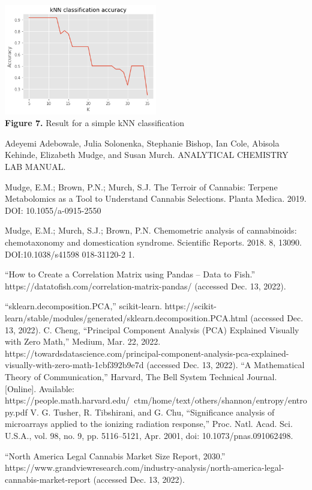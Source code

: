 \documentclass{article}
\begin{document}
\includegraphics[width=0.5\textwidth]{download.png}\\
\textbf{Figure 7.} Result for a simple kNN classification
\begin{thebibliography}{9}
Adeyemi Adebowale, Julia Solonenka, Stephanie Bishop, Ian Cole, Abisola Kehinde, Elizabeth Mudge, and Susan Murch. ANALYTICAL  CHEMISTRY  LAB MANUAL.

Mudge, E.M.; Brown, P.N.; Murch, S.J. The Terroir of Cannabis: Terpene Metabolomics as a Tool
 to Understand Cannabis Selections. Planta Medica. 2019. DOI: 10.1055/a-0915-2550

Mudge, E.M.; Murch, S.J.; Brown, P.N. Chemometric analysis of cannabinoids: chemotaxonomy
 and domestication syndrome. Scientific Reports. 2018. 8, 13090. DOI:10.1038/s41598
 018-31120-2 1. 

“How to Create a Correlation Matrix using Pandas – Data to Fish.” https://datatofish.com/correlation-matrix-pandas/ (accessed Dec. 13, 2022).

“sklearn.decomposition.PCA,” scikit-learn. https://scikit-learn/stable/modules/generated/sklearn.decomposition.PCA.html (accessed Dec. 13, 2022).
C. Cheng, “Principal Component Analysis (PCA) Explained Visually with Zero Math,” Medium, Mar. 22, 2022. https://towardsdatascience.com/principal-component-analysis-pca-explained-visually-with-zero-math-1cbf392b9e7d (accessed Dec. 13, 2022).
“A Mathematical Theory of Communication,” Harvard, The Bell System Technical Journal. [Online]. Available: https://people.math.harvard.edu/~ctm/home/text/others/shannon/entropy/entropy.pdf
V. G. Tusher, R. Tibshirani, and G. Chu, “Significance analysis of microarrays applied to the ionizing radiation response,” Proc. Natl. Acad. Sci. U.S.A., vol. 98, no. 9, pp. 5116–5121, Apr. 2001, doi: 10.1073/pnas.091062498.


“North America Legal Cannabis Market Size Report, 2030.” https://www.grandviewresearch.com/industry-analysis/north-america-legal-cannabis-market-report (accessed Dec. 13, 2022).

\end{thebibliography}
\end{document}

